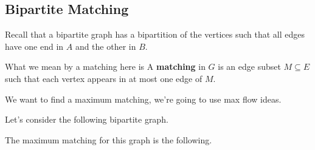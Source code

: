 \documentclass[12pt]{article}
\begin{document}
  \subsection{Bipartite Matching}

  Recall that a bipartite graph has a bipartition of the vertices such that all
  edges have one end in $A$ and the other in $B$.

  What we mean by a matching here is
  \Definition {}
  {
    A {\bf matching} in $G$ is an edge subset $M \subseteq E$ such that each
    vertex appears in at most one edge of $M$.
  }

  We want to find a maximum matching, we're going to use max flow ideas.

  Let's consider the following bipartite graph.

  \begin{center}
  \end{center}

  The maximum matching for this graph is the following.
\end{document}
